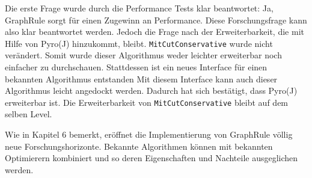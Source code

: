 Die erste Frage wurde durch die Performance Tests klar beantwortet: Ja, GraphRule sorgt für einen Zugewinn an Performance. Diese Forschungsfrage kann also klar beantwortet werden. Jedoch die Frage nach der Erweiterbarkeit, die mit Hilfe von Pyro(J) hinzukommt, bleibt. \texttt{MitCutConservative} wurde nicht verändert. Somit wurde dieser Algorithmus weder leichter erweiterbar noch einfacher zu durchschauen. Stattdessen ist ein neues Interface für einen bekannten Algorithmus entstanden  Mit diesem Interface kann auch dieser Algorithmus leicht angedockt werden. Dadurch hat sich bestätigt, dass Pyro(J) erweiterbar ist. Die Erweiterbarkeit von \texttt{MitCutConservative} bleibt auf dem selben Level.

Wie in Kapitel 6 bemerkt, eröffnet die Implementierung von GraphRule völlig neue Forschungshorizonte. Bekannte Algorithmen können mit bekannten Optimierern kombiniert und so deren Eigenschaften und Nachteile ausgeglichen werden.



